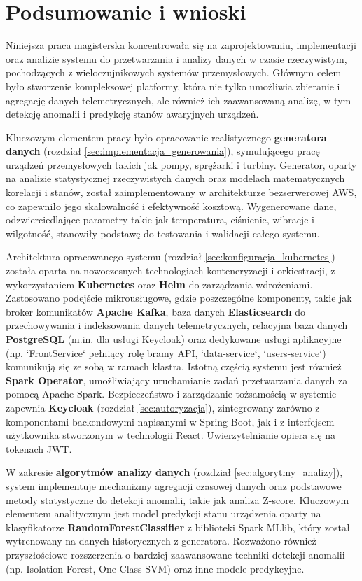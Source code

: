 \section{Podsumowanie i wnioski}
\label{sec:podsumowanie_wnioski}

Niniejsza praca magisterska koncentrowała się na zaprojektowaniu, implementacji oraz analizie systemu do przetwarzania i analizy danych w czasie rzeczywistym, pochodzących z wieloczujnikowych systemów przemysłowych. Głównym celem było stworzenie kompleksowej platformy, która nie tylko umożliwia zbieranie i agregację danych telemetrycznych, ale również ich zaawansowaną analizę, w tym detekcję anomalii i predykcję stanów awaryjnych urządzeń.

Kluczowym elementem pracy było opracowanie realistycznego \textbf{generatora danych} (rozdział \ref{sec:implementacja_generowania}), symulującego pracę urządzeń przemysłowych takich jak pompy, sprężarki i turbiny. Generator, oparty na analizie statystycznej rzeczywistych danych oraz modelach matematycznych korelacji i stanów, został zaimplementowany w architekturze bezserwerowej AWS, co zapewniło jego skalowalność i efektywność kosztową. Wygenerowane dane, odzwierciedlające parametry takie jak temperatura, ciśnienie, wibracje i wilgotność, stanowiły podstawę do testowania i walidacji całego systemu.

Architektura opracowanego systemu (rozdział \ref{sec:konfiguracja_kubernetes}) została oparta na nowoczesnych technologiach konteneryzacji i orkiestracji, z wykorzystaniem \textbf{Kubernetes} oraz \textbf{Helm} do zarządzania wdrożeniami. Zastosowano podejście mikrousługowe, gdzie poszczególne komponenty, takie jak broker komunikatów \textbf{Apache Kafka}, baza danych \textbf{Elasticsearch} do przechowywania i indeksowania danych telemetrycznych, relacyjna baza danych \textbf{PostgreSQL} (m.in. dla usługi Keycloak) oraz dedykowane usługi aplikacyjne (np. `FrontService` pełniący rolę bramy API, `data-service`, `users-service`) komunikują się ze sobą w ramach klastra. Istotną częścią systemu jest również \textbf{Spark Operator}, umożliwiający uruchamianie zadań przetwarzania danych za pomocą Apache Spark. Bezpieczeństwo i zarządzanie tożsamością w systemie zapewnia \textbf{Keycloak} (rozdział \ref{sec:autoryzacja}), zintegrowany zarówno z komponentami backendowymi napisanymi w Spring Boot, jak i z interfejsem użytkownika stworzonym w technologii React. Uwierzytelnianie opiera się na tokenach JWT.

W zakresie \textbf{algorytmów analizy danych} (rozdział \ref{sec:algorytmy_analizy}), system implementuje mechanizmy agregacji czasowej danych oraz podstawowe metody statystyczne do detekcji anomalii, takie jak analiza Z-score. Kluczowym elementem analitycznym jest model predykcji stanu urządzenia oparty na klasyfikatorze \textbf{RandomForestClassifier} z biblioteki Spark MLlib, który został wytrenowany na danych historycznych z generatora. Rozważono również przyszłościowe rozszerzenia o bardziej zaawansowane techniki detekcji anomalii (np. Isolation Forest, One-Class SVM) oraz inne modele predykcyjne.

